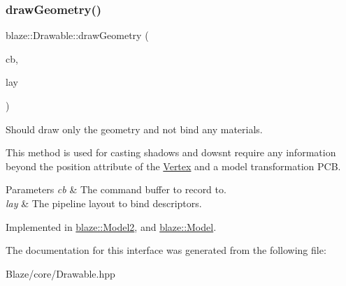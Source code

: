 \mbox{\label{classblaze_1_1Drawable_aa2bd171547027319e4254c47e0628163}} 
\subsubsection{\texorpdfstring{draw\+Geometry()}{drawGeometry()}}
{\footnotesize\ttfamily blaze\+::\+Drawable\+::draw\+Geometry (\begin{DoxyParamCaption}\item[{Vk\+Command\+Buffer}]{cb,  }\item[{Vk\+Pipeline\+Layout}]{lay }\end{DoxyParamCaption})\hspace{0.3cm}{\ttfamily [pure virtual]}}



Should draw only the geometry and not bind any materials. 

This method is used for casting shadows and dowsn\textquotesingle{}t require any information beyond the position attribute of the \hyperlink{structblaze_1_1Vertex}{Vertex} and a model transformation P\+CB.


\begin{DoxyParams}{Parameters}
{\em cb} & The command buffer to record to. \\
\hline
{\em lay} & The pipeline layout to bind descriptors. \\
\hline
\end{DoxyParams}


Implemented in \hyperlink{classblaze_1_1Model2_aadf59268e6faa861e27d6995a63552c3}{blaze\+::\+Model2}, and \hyperlink{classblaze_1_1Model_ab5427d1b48ee3aedea9e405aa3892f5c}{blaze\+::\+Model}.



The documentation for this interface was generated from the following file\+:\begin{DoxyCompactItemize}
\item 
Blaze/core/Drawable.\+hpp\end{DoxyCompactItemize}
